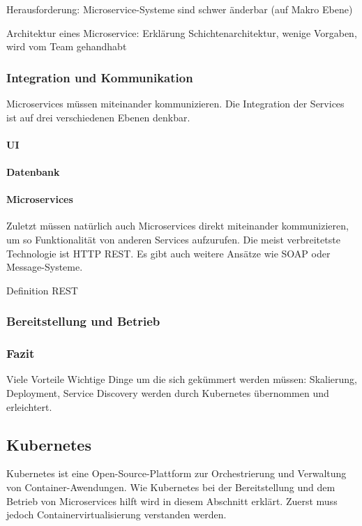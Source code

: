Herausforderung: Microservice-Systeme sind schwer änderbar (auf Makro Ebene)

Architektur eines Microservice: Erklärung Schichtenarchitektur, wenige Vorgaben, wird vom Team gehandhabt

\subsubsection{Integration und Kommunikation}

Microservices müssen miteinander kommunizieren. Die Integration der Services ist auf drei verschiedenen Ebenen denkbar.

\paragraph{UI}

\paragraph{Datenbank}

\paragraph{Microservices}

Zuletzt müssen natürlich auch Microservices direkt miteinander kommunizieren, um so Funktionalität von anderen Services aufzurufen. Die meist verbreitetste Technologie ist HTTP REST. Es gibt auch weitere Ansätze wie SOAP oder Message-Systeme.

{Definition REST}


\subsubsection{Bereitstellung und Betrieb}

\subsubsection{Fazit}

Viele Vorteile
Wichtige Dinge um die sich gekümmert werden müssen: Skalierung, Deployment, Service Discovery werden durch Kubernetes übernommen und erleichtert.


\subsection{Kubernetes}

Kubernetes ist eine Open-Source-Plattform zur Orchestrierung und Verwaltung von Container-Awendungen. Wie Kubernetes bei der Bereitstellung und dem Betrieb von Microservices hilft wird in diesem Abschnitt erklärt. Zuerst muss jedoch Containervirtualisierung verstanden werden.

